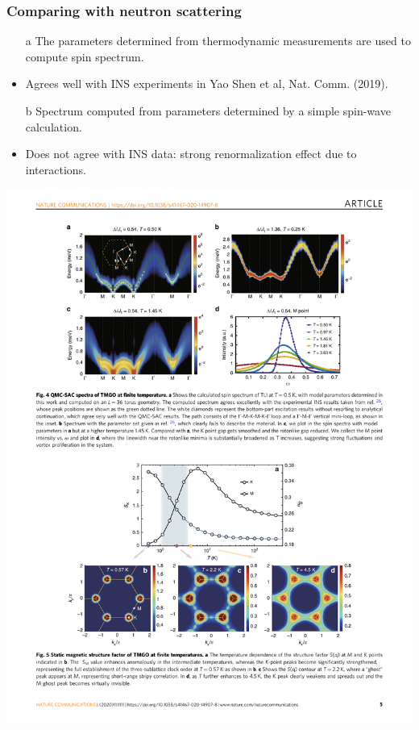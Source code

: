 \documentclass[xcolor=table, aspectratio=1610,ignorenonframetext]{beamer}
\begin{document}
\begin{frame}
  \frametitle{Comparing with neutron scattering}
  \begin{itemize}
    \item[a] The parameters determined from thermodynamic measurements are used to compute spin spectrum.
    \item Agrees well with INS experiments in Yao Shen et al, Nat. Comm. (2019).
    \item[b] Spectrum computed from parameters determined by a simple spin-wave calculation.
    \item Does not agree with INS data: strong renormalization effect due to interactions.
  \end{itemize}
  \begin{center}
    \includegraphics{spinwave-fit}
  \end{center}
\end{frame}

\end{document}
